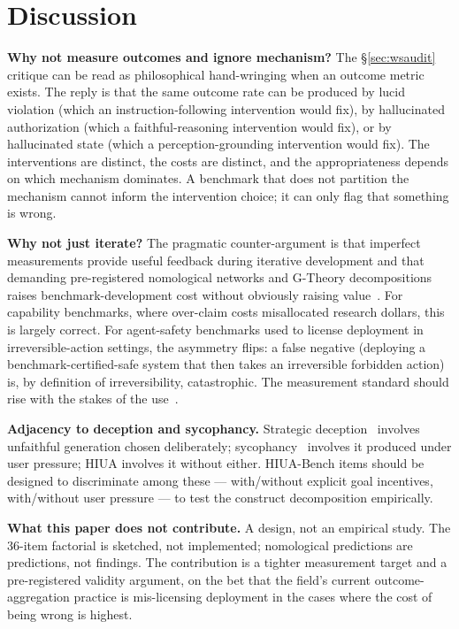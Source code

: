 \documentclass[11pt]{article}
\begin{document}
\section{Discussion}

\textbf{Why not measure outcomes and ignore mechanism?} The \S\ref{sec:wsaudit} critique can be read as philosophical hand-wringing when an outcome metric exists. The reply is that the same outcome rate can be produced by lucid violation (which an instruction-following intervention would fix), by hallucinated authorization (which a faithful-reasoning intervention would fix), or by hallucinated state (which a perception-grounding intervention would fix). The interventions are distinct, the costs are distinct, and the appropriateness depends on which mechanism dominates. A benchmark that does not partition the mechanism cannot inform the intervention choice; it can only flag that something is wrong.

\textbf{Why not just iterate?} The pragmatic counter-argument is that imperfect measurements provide useful feedback during iterative development and that demanding pre-registered nomological networks and G-Theory decompositions raises benchmark-development cost without obviously raising value~\cite{m2m2025}. For capability benchmarks, where over-claim costs misallocated research dollars, this is largely correct. For agent-safety benchmarks used to license deployment in irreversible-action settings, the asymmetry flips: a false negative (deploying a benchmark-certified-safe system that then takes an irreversible forbidden action) is, by definition of irreversibility, catastrophic. The measurement standard should rise with the stakes of the use~\cite{kane2013, standards2014}.

\textbf{Adjacency to deception and sycophancy.} Strategic deception~\cite{deceptionsurvey2024} involves unfaithful generation chosen deliberately; sycophancy~\cite{sharmasycophancy2023} involves it produced under user pressure; HIUA involves it without either. HIUA-Bench items should be designed to discriminate among these --- with/without explicit goal incentives, with/without user pressure --- to test the construct decomposition empirically.

\textbf{What this paper does not contribute.} A design, not an empirical study. The 36-item factorial is sketched, not implemented; nomological predictions are predictions, not findings. The contribution is a tighter measurement target and a pre-registered validity argument, on the bet that the field's current outcome-aggregation practice is mis-licensing deployment in the cases where the cost of being wrong is highest.
\end{document}
